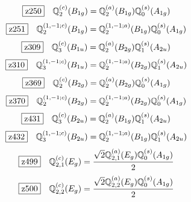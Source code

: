 \documentclass[fleqn,10pt,landscape]{jsarticle}
\begin{document}
\begin{dmath*}
\hspace*{3mm}\fbox{z250}\quad \mathbb{Q}_{2}^{(c)}(B_{1g})=\mathbb{Q}_{2}^{(a)}(B_{1g}) \mathbb{Q}_{0}^{(s)}(A_{1g})
\end{dmath*}
\begin{dmath*}
\hspace*{3mm}\fbox{z251}\quad \mathbb{Q}_{2}^{(1,-1;c)}(B_{1g})=\mathbb{Q}_{2}^{(1,-1;a)}(B_{1g}) \mathbb{Q}_{0}^{(s)}(A_{1g})
\end{dmath*}
\begin{dmath*}
\hspace*{3mm}\fbox{z309}\quad \mathbb{Q}_{3}^{(c)}(B_{1u})=\mathbb{Q}_{2}^{(a)}(B_{2g}) \mathbb{Q}_{1}^{(s)}(A_{2u})
\end{dmath*}
\begin{dmath*}
\hspace*{3mm}\fbox{z310}\quad \mathbb{Q}_{3}^{(1,-1;c)}(B_{1u})=\mathbb{Q}_{2}^{(1,-1;a)}(B_{2g}) \mathbb{Q}_{1}^{(s)}(A_{2u})
\end{dmath*}
\begin{dmath*}
\hspace*{3mm}\fbox{z369}\quad \mathbb{Q}_{2}^{(c)}(B_{2g})=\mathbb{Q}_{2}^{(a)}(B_{2g}) \mathbb{Q}_{0}^{(s)}(A_{1g})
\end{dmath*}
\begin{dmath*}
\hspace*{3mm}\fbox{z370}\quad \mathbb{Q}_{2}^{(1,-1;c)}(B_{2g})=\mathbb{Q}_{2}^{(1,-1;a)}(B_{2g}) \mathbb{Q}_{0}^{(s)}(A_{1g})
\end{dmath*}
\begin{dmath*}
\hspace*{3mm}\fbox{z431}\quad \mathbb{Q}_{3}^{(c)}(B_{2u})=\mathbb{Q}_{2}^{(a)}(B_{1g}) \mathbb{Q}_{1}^{(s)}(A_{2u})
\end{dmath*}
\begin{dmath*}
\hspace*{3mm}\fbox{z432}\quad \mathbb{Q}_{3}^{(1,-1;c)}(B_{2u})=\mathbb{Q}_{2}^{(1,-1;a)}(B_{1g}) \mathbb{Q}_{1}^{(s)}(A_{2u})
\end{dmath*}
\begin{dmath*}
\hspace*{3mm}\fbox{z499}\quad \mathbb{Q}_{2,1}^{(c)}(E_{g})=\frac{\sqrt{2} \mathbb{Q}_{2,1}^{(a)}(E_{g}) \mathbb{Q}_{0}^{(s)}(A_{1g})}{2}
\end{dmath*}
\begin{dmath*}
\hspace*{3mm}\fbox{z500}\quad \mathbb{Q}_{2,2}^{(c)}(E_{g})=\frac{\sqrt{2} \mathbb{Q}_{2,2}^{(a)}(E_{g}) \mathbb{Q}_{0}^{(s)}(A_{1g})}{2}
\end{dmath*}
\end{document}
